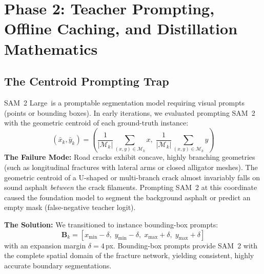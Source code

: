 \documentclass[11pt,a4paper]{article}
\newcommand{\sam}{SAM~2 Large}
\begin{document}
\section{Phase 2: Teacher Prompting, Offline Caching, and Distillation Mathematics}
\label{sec:phase2}

\subsection{The Centroid Prompting Trap}
\sam\ is a promptable segmentation model requiring visual prompts (points or bounding boxes). 
In early iterations, we evaluated prompting SAM~2 with the geometric centroid of each ground-truth instance:
\begin{equation}
  (\bar{x}_k, \bar{y}_k) = \left( \frac{1}{|\mathcal{M}_k|} \sum_{(x,y) \in \mathcal{M}_k} x, \; \frac{1}{|\mathcal{M}_k|} \sum_{(x,y) \in \mathcal{M}_k} y \right)
\end{equation}
\textbf{The Failure Mode:} Road cracks exhibit concave, highly branching geometries (such as longitudinal fractures with lateral arms or closed alligator meshes). 
The geometric centroid of a U-shaped or multi-branch crack almost invariably falls on sound asphalt \emph{between} the crack filaments. 
Prompting SAM~2 at this coordinate caused the foundation model to segment the background asphalt or predict an empty mask (false-negative teacher logit).

\textbf{The Solution:} We transitioned to instance bounding-box prompts:
\begin{equation}
  \mathbf{B}_k = [x_{\min} - \delta, \; y_{\min} - \delta, \; x_{\max} + \delta, \; y_{\max} + \delta]
\end{equation}
with an expansion margin $\delta=4$\,px. 
Bounding-box prompts provide SAM~2 with the complete spatial domain of the fracture network, yielding consistent, highly accurate boundary segmentations.
\end{document}
